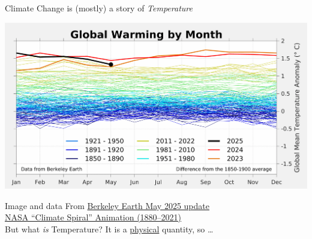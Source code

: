 \documentclass[12pt]{beamer}
\begin{document}
\begin{frame}{Climate Change is (mostly) a story of {\em Temperature}}

\begin{center}
\includegraphics[width=\textwidth]{images/global-mean-temp-anomaly-by-month_may-2025-report_BEST}
\end{center}
\vspace{-0.5cm}
\hfill{\tiny Image and data From \href{https://berkeleyearth.org/may-2025-temperature-update/}{Berkeley Earth May 2025 update}}\\[-6pt]
\hfill{\tiny \href{https://www.youtube.com/watch?v=jWoCXLuTIkI}{NASA ``Climate Spiral'' Animation (1880--2021)}}\\[12pt]

But what {\em is} Temperature?  It is a \underline{physical} quantity, so \ldots
\end{frame}
\end{document}
